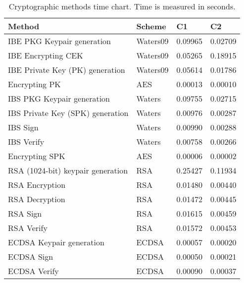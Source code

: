 \begin{table}[h]
  \begin{tabular}{llll}
  Method                                      & Scheme          & C1                   & C2                   \\ \hline
  IBE PKG Keypair generation                  & Waters09        & 0.09965              & 0.02709              \\ %
  IBE Encrypting CEK                          & Waters09        & 0.05265              & 0.18915              \\ %
  IBE Private Key (PK) generation             & Waters09        & 0.05614              & 0.01786              \\ %
  Encrypting PK                               & AES             & 0.00013              & 0.00010              \\ %
  IBS PKG Keypair generation                  & Waters          & 0.09755              & 0.02715              \\ %
  IBS Private Key (SPK) generation            & Waters          & 0.00976              & 0.00287              \\ %
  IBS Sign                                    & Waters          & 0.00990              & 0.00288              \\ %
  IBS Verify                                  & Waters          & 0.00758              & 0.00266              \\ %
  Encrypting SPK                              & AES             & 0.00006              & 0.00002              \\ %
  RSA (1024-bit) keypair generation           & RSA             & 0.25427              & 0.11934              \\ %
  RSA Encryption                              & RSA             & 0.01480              & 0.00440              \\ %
  RSA Decryption                              & RSA             & 0.01472              & 0.00445              \\ %
  RSA Sign                                    & RSA             & 0.01615              & 0.00459              \\ %
  RSA Verify                                  & RSA             & 0.01572              & 0.00453              \\ %
  ECDSA Keypair generation                    & ECDSA           & 0.00057              & 0.00020              \\ %
  ECDSA Sign                                  & ECDSA           & 0.00050              & 0.00021              \\ %
  ECDSA Verify                                & ECDSA           & 0.00090              & 0.00037              \\ %
  \end{tabular}
  \caption{Cryptographic methods time chart. Time is measured in seconds.}
  \label{tbl:time_chart}
\end{table}


